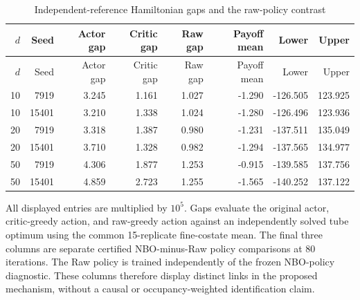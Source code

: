 \begingroup\small\setlength{\tabcolsep}{3pt}
\begin{longtable}{rrrrrrrr}
\caption{Independent-reference Hamiltonian gaps and the raw-policy contrast}\label{tab:r14hamiltonian}\\
\toprule
$d$ & Seed & Actor gap & Critic gap & Raw gap & Payoff mean & Lower & Upper\\\midrule
\endfirsthead
\toprule
$d$ & Seed & Actor gap & Critic gap & Raw gap & Payoff mean & Lower & Upper\\\midrule
\endhead
10 & 7919 & 3.245 & 1.161 & 1.027 & -1.290 & -126.505 & 123.925\\
10 & 15401 & 3.210 & 1.338 & 1.024 & -1.280 & -126.496 & 123.936\\
20 & 7919 & 3.318 & 1.387 & 0.980 & -1.231 & -137.511 & 135.049\\
20 & 15401 & 3.710 & 1.328 & 0.982 & -1.294 & -137.565 & 134.977\\
50 & 7919 & 4.306 & 1.877 & 1.253 & -0.915 & -139.585 & 137.756\\
50 & 15401 & 4.859 & 2.723 & 1.255 & -1.565 & -140.252 & 137.122\\
\bottomrule\end{longtable}
\noindent All displayed entries are multiplied by $10^5$. Gaps evaluate the original actor, critic-greedy action, and raw-greedy action against an independently solved tube optimum using the common 15-replicate fine-costate mean. The final three columns are separate certified NBO-minus-Raw policy comparisons at 80 iterations. The Raw policy is trained independently of the frozen NBO-policy diagnostic. These columns therefore display distinct links in the proposed mechanism, without a causal or occupancy-weighted identification claim.
\endgroup
